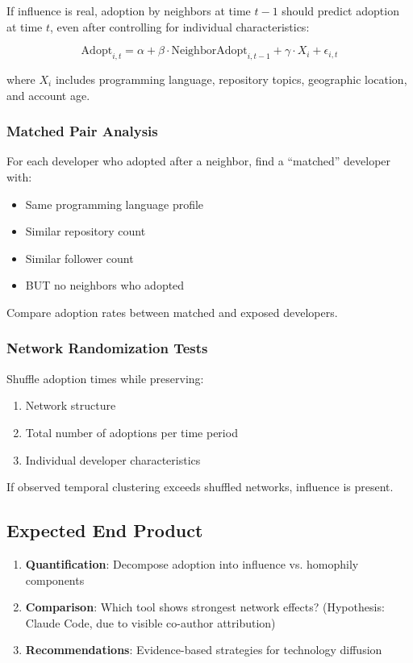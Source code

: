 \documentclass[11pt,letterpaper]{article}
\begin{document}
If influence is real, adoption by neighbors at time $t-1$ should predict adoption at time $t$, even after controlling for individual characteristics:

\[
\text{Adopt}_{i,t} = \alpha + \beta \cdot \text{NeighborAdopt}_{i,t-1} + \gamma \cdot X_i + \epsilon_{i,t}
\]

where $X_i$ includes programming language, repository topics, geographic location, and account age.

\subsubsection{Matched Pair Analysis}

For each developer who adopted after a neighbor, find a ``matched'' developer with:
\begin{itemize}
    \item Same programming language profile
    \item Similar repository count
    \item Similar follower count
    \item BUT no neighbors who adopted
\end{itemize}

Compare adoption rates between matched and exposed developers.

\subsubsection{Network Randomization Tests}

Shuffle adoption times while preserving:
\begin{enumerate}
    \item Network structure
    \item Total number of adoptions per time period
    \item Individual developer characteristics
\end{enumerate}

If observed temporal clustering exceeds shuffled networks, influence is present.

\subsection{Expected End Product}

\begin{enumerate}
    \item \textbf{Quantification}: Decompose adoption into influence vs. homophily components
    \item \textbf{Comparison}: Which tool shows strongest network effects? (Hypothesis: Claude Code, due to visible co-author attribution)
    \item \textbf{Recommendations}: Evidence-based strategies for technology diffusion
\end{enumerate}
\end{document}
